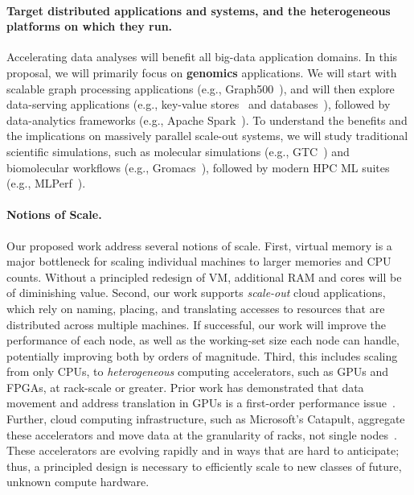 \paragraph{Target distributed applications and systems, and the heterogeneous platforms on which they run.}

Accelerating data analyses will benefit all big-data application domains.  In
this proposal, we will primarily focus on \textbf{genomics} applications. We will
start with scalable graph processing applications (e.g.,
Graph500~\cite{graph500}), and will then explore data-serving applications
(e.g., key-value stores~\cite{lakshman2010cassandra, papyruskv-kim-sc17} and
databases~\cite{MySQL}), followed by data-analytics frameworks (e.g., Apache
Spark~\cite{Zaharia:Spark:HotCloud10}). To understand the benefits and the
implications on massively parallel scale-out systems, we will study traditional
scientific simulations, such as molecular simulations (e.g., GTC~\cite{GTC}) and
biomolecular workflows (e.g., Gromacs~\cite{GROMACS}), followed by modern HPC ML
suites (e.g., MLPerf~\cite{MLPerf}).

\paragraph{Notions of Scale.}  Our proposed work address several notions of
scale.  First, virtual memory is a major bottleneck for scaling individual
machines to larger memories and CPU counts.  Without a principled redesign of
VM, additional RAM and cores will be of diminishing value.  Second, our work
supports \emph{scale-out} cloud applications, which rely on naming, placing, and
translating accesses to resources that are distributed across multiple machines.
If successful, our work will improve the performance of each node, as well as
the working-set size each node can handle, potentially improving both by orders
of magnitude.  Third, this includes scaling from only CPUs, to {\em
heterogeneous} computing accelerators, such as GPUs and FPGAs, at rack-scale or
greater.  Prior work has demonstrated that data movement and address translation
in GPUs is a first-order performance issue~\cite{pichai:gpu,
power:gpummu,rossbach:ptask}. Further, cloud computing infrastructure, such as
Microsoft's Catapult, aggregate these accelerators and move data  at the
granularity of racks, not single nodes~\cite{putnam:catapult}.  These
accelerators are evolving rapidly and in ways that are hard to anticipate; thus,
a principled design is necessary to efficiently scale to new classes of future,
unknown compute hardware.


